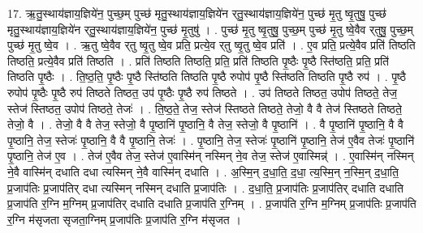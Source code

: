 \documentclass[17pt]{extarticle}
\begin{document}
17. ऋ॒तु॒स्थाय॑ज्ञाय॒ज्ञिये॑न॒ पुच्छ॒म् पुच्छ॑ मृतु॒स्थाय॑ज्ञाय॒ज्ञिये॑न र्‌तु॒स्थाय॑ज्ञाय॒ज्ञिये॑न॒ पुच्छ॑ मृ॒तु ष्वृ॒तुषु॒ पुच्छ॑ मृतु॒स्थाय॑ज्ञाय॒ज्ञिये॑न र्‌तु॒स्थाय॑ज्ञाय॒ज्ञिये॑न॒ पुच्छ॑ मृ॒तुषु॑ । . पुच्छ॑ मृ॒तु ष्वृ॒तुषु॒ पुच्छ॒म् पुच्छ॑ मृ॒तु ष्वे॒वैव र्‌तुषु॒ पुच्छ॒म् पुच्छ॑ मृ॒तु ष्वे॒व । . ऋ॒तु ष्वे॒वैव र्‌तु ष्वृ॒तु ष्वे॒व प्रति॒ प्रत्ये॒व र्‌तु ष्वृ॒तु ष्वे॒व प्रति॑ । . ए॒व प्रति॒ प्रत्ये॒वैव प्रति॑ तिष्ठति तिष्ठति॒ प्रत्ये॒वैव प्रति॑ तिष्ठति । . प्रति॑ तिष्ठति तिष्ठति॒ प्रति॒ प्रति॑ तिष्ठति पृ॒ष्ठैः पृ॒ष्ठै स्ति॑ष्ठति॒ प्रति॒ प्रति॑ तिष्ठति पृ॒ष्ठैः । . ति॒ष्ठ॒ति॒ पृ॒ष्ठैः पृ॒ष्ठै स्ति॑ष्ठति तिष्ठति पृ॒ष्ठै रुपोप॑ पृ॒ष्ठै स्ति॑ष्ठति तिष्ठति पृ॒ष्ठै रुप॑ । . पृ॒ष्ठै रुपोप॑ पृ॒ष्ठैः पृ॒ष्ठै रुप॑ तिष्ठते तिष्ठत॒ उप॑ पृ॒ष्ठैः पृ॒ष्ठै रुप॑ तिष्ठते । . उप॑ तिष्ठते तिष्ठत॒ उपोप॑ तिष्ठते॒ तेज॒ स्तेज॑ स्तिष्ठत॒ उपोप॑ तिष्ठते॒ तेजः॑ । . ति॒ष्ठ॒ते॒ तेज॒ स्तेज॑ स्तिष्ठते तिष्ठते॒ तेजो॒ वै वै तेज॑ स्तिष्ठते तिष्ठते॒ तेजो॒ वै । . तेजो॒ वै वै तेज॒ स्तेजो॒ वै पृ॒ष्ठानि॑ पृ॒ष्ठानि॒ वै तेज॒ स्तेजो॒ वै पृ॒ष्ठानि॑ । . वै पृ॒ष्ठानि॑ पृ॒ष्ठानि॒ वै वै पृ॒ष्ठानि॒ तेज॒ स्तेजः॑ पृ॒ष्ठानि॒ वै वै पृ॒ष्ठानि॒ तेजः॑ । . पृ॒ष्ठानि॒ तेज॒ स्तेजः॑ पृ॒ष्ठानि॑ पृ॒ष्ठानि॒ तेज॑ ए॒वैव तेजः॑ पृ॒ष्ठानि॑ पृ॒ष्ठानि॒ तेज॑ ए॒व । . तेज॑ ए॒वैव तेज॒ स्तेज॑ ए॒वास्मि॑न् नस्मिन् ने॒व तेज॒ स्तेज॑ ए॒वास्मिन्न्॑ । . ए॒वास्मि॑न् नस्मिन् ने॒वै वास्मि॑न् दधाति दधा त्यस्मिन् ने॒वै वास्मि॑न् दधाति । . अ॒स्मि॒न् द॒धा॒ति॒ द॒धा॒ त्य॒स्मि॒न् न॒स्मि॒न् द॒धा॒ति॒ प्र॒जाप॑तिः प्र॒जाप॑तिर् दधा त्यस्मिन् नस्मिन् दधाति प्र॒जाप॑तिः । . द॒धा॒ति॒ प्र॒जाप॑तिः प्र॒जाप॑तिर् दधाति दधाति प्र॒जाप॑ति र॒ग्नि म॒ग्निम् प्र॒जाप॑तिर् दधाति दधाति प्र॒जाप॑ति र॒ग्निम् । . प्र॒जाप॑ति र॒ग्नि म॒ग्निम् प्र॒जाप॑तिः प्र॒जाप॑ति र॒ग्नि म॑सृजता सृजता॒ग्निम् प्र॒जाप॑तिः प्र॒जाप॑ति र॒ग्नि म॑सृजत । \newline
\end{document}
